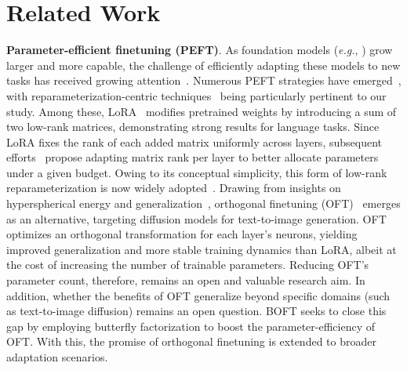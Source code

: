 \section{Related Work}

\textbf{Parameter-efficient finetuning (PEFT)}. As foundation models (\emph{e.g.}, \cite{brown2020language,radford2021learning,rombach2022high,kirillov2023segment}) grow larger and more capable, the challenge of efficiently adapting these models to new tasks has received growing attention~\cite{treviso2023efficient,ding2023parameter,lialin2023scaling}. Numerous PEFT strategies have emerged~\cite{houlsby2019parameter,aghajanyan2020intrinsic,hulora2022,edalati2022krona,wang2022adamix,gheini2021cross,zaken2022bitfit,guo2020parameter,sung2021training,ansell2022composable,lester2021power,li2021prefix,vu2022spot,he2021towards,mao2021unipelt,karimi2021compacter,liu2022few,sung2022lst,chen2022parameter,jia2022visual,chen2022adaptformer,zhang2022neural,jie2023fact,lian2022scaling,luo2023towards}, with reparameterization-centric techniques~\cite{aghajanyan2020intrinsic,hulora2022,edalati2022krona} being particularly pertinent to our study. Among these, LoRA~\cite{hulora2022} modifies pretrained weights by introducing a sum of two low-rank matrices, demonstrating strong results for language tasks. Since LoRA fixes the rank of each added matrix uniformly across layers, subsequent efforts~\cite{zhang2022adaptive,valipour2022dylora,zhang2023increlora} propose adapting matrix rank per layer to better allocate parameters under a given budget. Owing to its conceptual simplicity, this form of low-rank reparameterization is now widely adopted~\cite{dettmers2023qlora,zi2023delta,chavan2023one}. Drawing from insights on hyperspherical energy and generalization~\cite{liu2018learning,liu2021orthogonal}, orthogonal finetuning (OFT)~\cite{qiu2023controlling} emerges as an alternative, targeting diffusion models for text-to-image generation. OFT optimizes an orthogonal transformation for each layer's neurons, yielding improved generalization and more stable training dynamics than LoRA, albeit at the cost of increasing the number of trainable parameters. Reducing OFT’s parameter count, therefore, remains an open and valuable research aim. In addition, whether the benefits of OFT generalize beyond specific domains (such as text-to-image diffusion) remains an open question. BOFT seeks to close this gap by employing butterfly factorization to boost the parameter-efficiency of OFT. With this, the promise of orthogonal finetuning is extended to broader adaptation scenarios.

